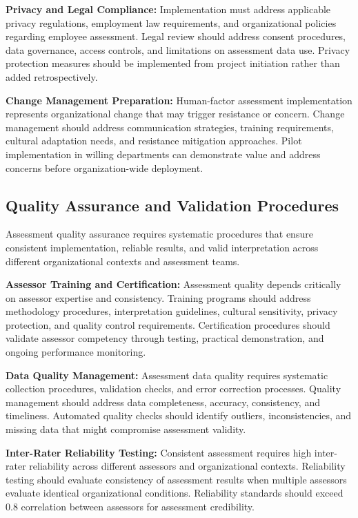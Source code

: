\documentclass[10pt, twocolumn]{article}
\begin{document}
\textbf{Privacy and Legal Compliance:} Implementation must address applicable privacy regulations, employment law requirements, and organizational policies regarding employee assessment. Legal review should address consent procedures, data governance, access controls, and limitations on assessment data use. Privacy protection measures should be implemented from project initiation rather than added retrospectively.

\textbf{Change Management Preparation:} Human-factor assessment implementation represents organizational change that may trigger resistance or concern. Change management should address communication strategies, training requirements, cultural adaptation needs, and resistance mitigation approaches. Pilot implementation in willing departments can demonstrate value and address concerns before organization-wide deployment.

\subsection{Quality Assurance and Validation Procedures}

Assessment quality assurance requires systematic procedures that ensure consistent implementation, reliable results, and valid interpretation across different organizational contexts and assessment teams.

\textbf{Assessor Training and Certification:} Assessment quality depends critically on assessor expertise and consistency. Training programs should address methodology procedures, interpretation guidelines, cultural sensitivity, privacy protection, and quality control requirements. Certification procedures should validate assessor competency through testing, practical demonstration, and ongoing performance monitoring.

\textbf{Data Quality Management:} Assessment data quality requires systematic collection procedures, validation checks, and error correction processes. Quality management should address data completeness, accuracy, consistency, and timeliness. Automated quality checks should identify outliers, inconsistencies, and missing data that might compromise assessment validity.

\textbf{Inter-Rater Reliability Testing:} Consistent assessment requires high inter-rater reliability across different assessors and organizational contexts. Reliability testing should evaluate consistency of assessment results when multiple assessors evaluate identical organizational conditions. Reliability standards should exceed 0.8 correlation between assessors for assessment credibility.
\end{document}
